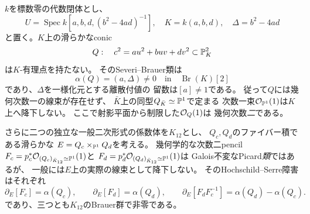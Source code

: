 \begin{proposition}[普遍二次形式のconicは一般に非分裂]
\label{prop:qa-universal-conic-brauer-obstruction}
$k$を標数零の代数閉体とし、
\[
 U=\operatorname{Spec}k[a,b,d,(b^2-4ad)^{-1}],
 \quad K=k(a,b,d),\quad \Delta=b^2-4ad
\]
と置く。$K$上の滑らかなconic
\begin{equation}
 Q:\quad c^2=au^2+buv+dv^2\subset\mathbb P^2_K
 \label{eq:qa-generic-conic}
\end{equation}
は$K$-有理点を持たない。
そのSeveri--Brauer類は
\[
 \alpha(Q)=(a,\Delta)\ne0\quad\text{in}\quad
 \operatorname{Br}(K)[2]
 \tag{Brauer-class}\label{eq:qa-conic-brauer-class}
\]
であり、$\Delta$を一様化元とする離散付値の
留数は$[a]\ne1$である。
従って$Q$には幾何次数一の線束が存在せず、
$\bar K$上の同型$Q_{\bar K}\simeq\mathbb P^1$で定まる
次数一束$\mathcal O_{\mathbb P^1}(1)$は$K$上へ降下しない。
ここで射影平面から制限した$\mathcal O_Q(1)$は
幾何次数\emph{二}である。

さらに二つの独立な一般二次形式の係数体を$K_{12}$とし、
$Q_c,Q_d$のファイバー積である滑らかな
$E=Q_c\times_{\mathbb P^1}Q_d$を考える。
幾何学的な次数二pencil
$F_c=p_c^*\mathcal O_{(Q_c)_{\bar K_{12}}\simeq\mathbb P^1}(1)$と
$F_d=p_d^*\mathcal O_{(Q_d)_{\bar K_{12}}\simeq\mathbb P^1}(1)$は
Galois不変なPicard\emph{類}ではあるが、
一般には$E$上の実際の線束として降下しない。
そのHochschild--Serre障害はそれぞれ
\begin{equation}
 \partial_E[F_c]=\alpha(Q_c),\qquad
 \partial_E[F_d]=\alpha(Q_d),\qquad
 \partial_E[F_dF_c^{-1}]=\alpha(Q_d)-\alpha(Q_c).
 \label{eq:qa-point-pencils-brauer-obstruction}
\end{equation}
であり、三つとも$K_{12}$のBrauer群で非零である。
\end{proposition}
